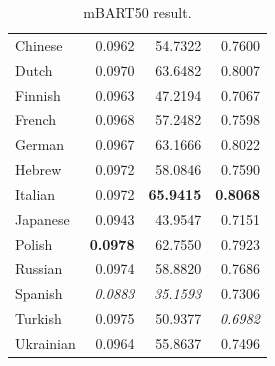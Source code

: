 \documentclass[a4paper]{article}
\begin{document}
\begin{table}[htbp]
\begin{minipage}{0.49\linewidth}
\begin{tabular}{|l|r|r|r|}
            \hline
            Chinese           & 0.0962          & 54.7322            & 0.7600          \\
            Dutch             & 0.0970          & 63.6482            & 0.8007          \\
            Finnish           & 0.0963          & 47.2194            & 0.7067          \\
            French            & 0.0968          & 57.2482            & 0.7598          \\
            German            & 0.0967          & 63.1666            & 0.8022          \\
            Hebrew            & 0.0972          & 58.0846            & 0.7590          \\
            Italian           & 0.0972          & \textbf{65.9415}   & \textbf{0.8068} \\
            Japanese          & 0.0943          & 43.9547            & 0.7151          \\
            Polish            & \textbf{0.0978} & 62.7550            & 0.7923          \\
            Russian           & 0.0974          & 58.8820            & 0.7686          \\
            Spanish           & \textit{0.0883} & \textit{35.1593}   & 0.7306          \\
            Turkish           & 0.0975          & 50.9377            & \textit{0.6982} \\
            Ukrainian         & 0.0964          & 55.8637            & 0.7496          \\
            \hline
        \end{tabular}
        \caption{mBART50 result.}
        \label{table:mbart_result}
    \end{minipage}
\end{table}
\end{document}
